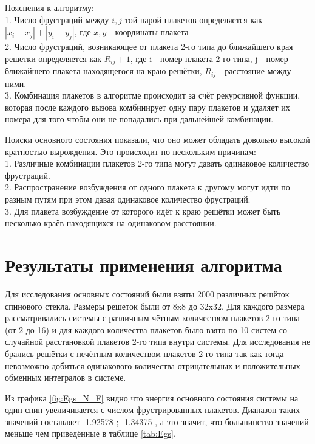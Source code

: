 \documentclass[utf8, babel, sor, jor, amsmath, amssymb, reprint]{elsarticle} %
\begin{document}
Пояснения к алгоритму:\\
1. Число фрустраций между $i,j$-той парой плакетов определяется как $\left|x_i-x_j\right|+\left|y_i-y_j\right|$, где $x, y$ - координаты плакета\\
2. Число фрустраций, возникающее от плакета 2-го типа до ближайшего края решетки определяется как $R_{ij}+1$, где i - номер плакета 2-го типа, j - номер ближайшего плакета находящегося на краю решётки, $R_{ij}$ - расстояние между ними.\\
3. Комбинация плакетов в алгоритме происходит за счёт рекурсивной функции, которая после каждого вызова комбинирует одну пару плакетов и удаляет их номера для того чтобы они не попадались при дальнейшей комбинации. 

Поиски основного состояния показали, что оно может обладать довольно высокой кратностью вырождения. Это происходит по нескольким причинам:\\
1. Различные комбинации плакетов 2-го типа могут давать одинаковое количество фрустраций.\\
2. Распространение возбуждения от одного плакета к другому могут идти по разным путям при этом давая одинаковое количество фрустраций.\\
3. Для плакета возбуждение от которого идёт к краю решётки может быть несколько краёв находящихся на одинаковом расстоянии.\\

\section{Результаты применения алгоритма}
Для исследования основных состояний были взяты 2000 различных решёток спинового стекла.
Размеры решеток были от 8x8 до 32x32. Для каждого размера рассматривались системы с различным чётным количеством плакетов 2-го типа (от 2 до 16) и для каждого количества плакетов было взято по 10 систем со случайной расстановкой плакетов 2-го типа внутри системы. Для исследования не  брались решётки с нечётным количеством плакетов 2-го типа так как тогда невозможно добиться одинакового количества отрицательных и положительных обменных интегралов в системе. 

Из графика \ref{fig:Egs_N_F} видно что энергия основного состояния системы на один спин увеличивается с числом фрустрированных плакетов. Диапазон таких значений составляет -1.92578 ; -1.34375 , а это значит, что большинство значений меньше чем приведённые в таблице \ref{tab:Egs}. 
\end{document}
